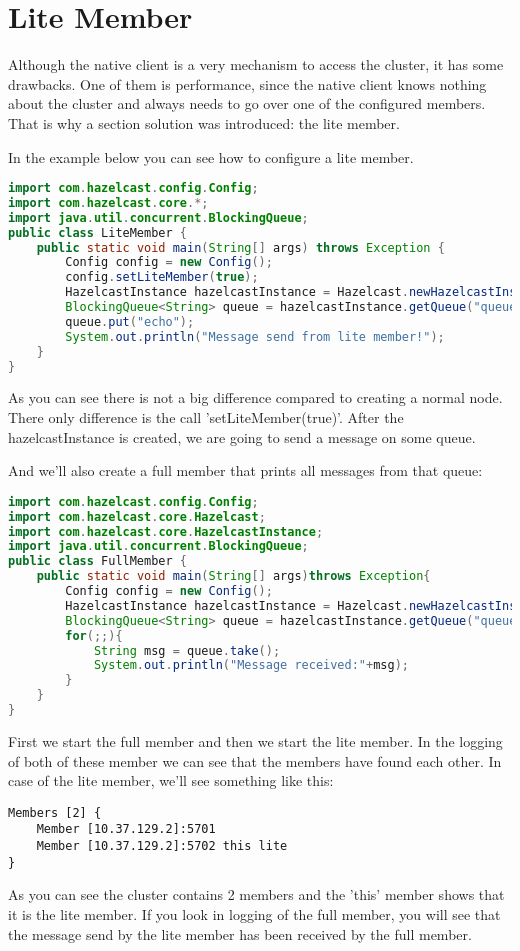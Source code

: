 \section{Lite Member}
Although the native client is a very mechanism to access the cluster, it has some drawbacks. One of them is performance, since the native client knows nothing about the cluster and always needs to go over one of the configured members. That is why a section solution was introduced: the lite member. 

In the example below you can see how to configure a lite member.
\begin{lstlisting}[language=java]
import com.hazelcast.config.Config;
import com.hazelcast.core.*;
import java.util.concurrent.BlockingQueue;
public class LiteMember {
    public static void main(String[] args) throws Exception {
        Config config = new Config();
        config.setLiteMember(true);
        HazelcastInstance hazelcastInstance = Hazelcast.newHazelcastInstance(config);
        BlockingQueue<String> queue = hazelcastInstance.getQueue("queue");
        queue.put("echo");
        System.out.println("Message send from lite member!");
    }
}
\end{lstlisting}
As you can see there is not a big difference compared to creating a normal node. There only difference is the call 'setLiteMember(true)'. After the hazelcastInstance is created, we are going to send a message on some queue.

And we'll also create a full member that prints all messages from that queue:
\begin{lstlisting}[language=java]
import com.hazelcast.config.Config;
import com.hazelcast.core.Hazelcast;
import com.hazelcast.core.HazelcastInstance;
import java.util.concurrent.BlockingQueue;
public class FullMember {
    public static void main(String[] args)throws Exception{
        Config config = new Config();
        HazelcastInstance hazelcastInstance = Hazelcast.newHazelcastInstance(config);
        BlockingQueue<String> queue = hazelcastInstance.getQueue("queue");
        for(;;){
            String msg = queue.take();
            System.out.println("Message received:"+msg);
        }
    }
}
\end{lstlisting}
First we start the full member and then we start the lite member. In the logging of both of these member we can see that the members have found each other. In case of the lite member, we'll see something like this:
\begin{verbatim}
Members [2] {
    Member [10.37.129.2]:5701
    Member [10.37.129.2]:5702 this lite
}	
\end{verbatim}	
As you can see the cluster contains 2 members and the 'this' member shows that it is the lite member. If you look in logging of the full member, you will see that the message send by the lite member has been received by the full member.

